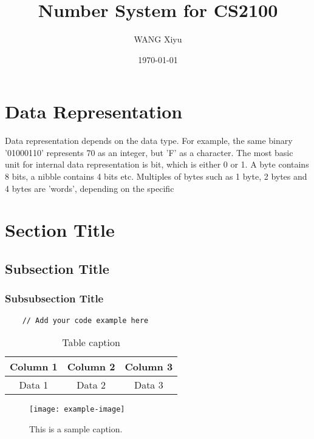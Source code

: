 \documentclass[12pt]{article} %
\title{Number System for CS2100}
\author{WANG Xiyu}
\date{\today}
\begin{document}
\maketitle

\tableofcontents %

\section{Data Representation}
Data representation depends on the data type.
For example, the same binary '01000110' represents 70 as an integer, but 'F' as a character.
The most basic unit for internal data representation is bit, which is either 0 or 1.
A byte contains 8 bits, a nibble contains 4 bits etc.
Multiples of bytes such as 1 byte, 2 bytes and 4 bytes are 'words', depending on the specific

\section{Section Title}

\subsection{Subsection Title}

\subsubsection{Subsubsection Title}

\begin{lstlisting}
    // Add your code example here
\end{lstlisting}

\begin{table}[h]
    \centering
    \begin{tabular}{|c|c|c|}
    \hline
    Column 1 & Column 2 & Column 3 \\ \hline
    Data 1 & Data 2 & Data 3 \\ \hline
    \end{tabular}
    \caption{Table caption}
\end{table}

\begin{figure}[h]
    \centering
    \texttt{[image: example-image]} %
    \caption{This is a sample caption.}
    \label{fig:example}
\end{figure}
\end{document}
